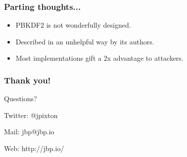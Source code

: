 \documentclass{beamer}
\begin{document}
\frame
{
  \frametitle{Parting thoughts...}

  \begin{itemize}
    \item<1-> PBKDF2 is not wonderfully designed.
    \item<2-> Described in an unhelpful way by its authors.
    \item<3-> Most implementations gift a 2x advantage to attackers.
  \end{itemize}
}

\frame
{
  \frametitle{Thank you!}
  Questions?

  \vspace{5em}

  Twitter: @jpixton

  Mail: jbp@jbp.io
  
  Web: http://jbp.io/
}
\end{document}
